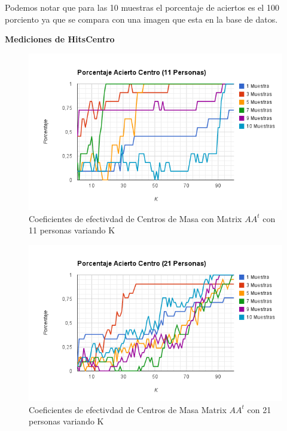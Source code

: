 Podemos notar  que para las 10 muestras el porcentaje de aciertos es el 100 porciento ya que se compara con una imagen que esta en la base de datos. 

\textbf{Mediciones de HitsCentro}

\begin{figure}[H]
\includegraphics[width=1\textwidth]{img/imagem.png}
     \caption{Coeficientes de efectivdad de Centros de Masa con Matrix $AA^t$ con 11 personas variando K}
\end{figure}

\begin{figure}[H]
\includegraphics[width=1\textwidth]{img/imagen.png}
     \caption{Coeficientes de efectivdad de Centros de Masa Matrix $AA^t$ con 21 personas variando K}
\end{figure}

